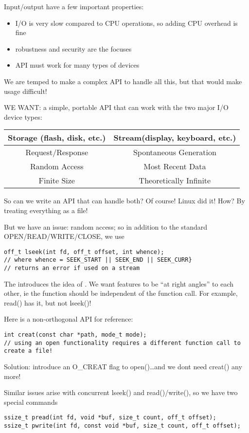 \documentclass[../../lecture_notes.tex]{subfiles}
\begin{document}
Input/output have a few important properties:
\begin{itemize}
\item I/O is very slow compared to CPU operations, so adding CPU overhead is fine
\item robustness and security are the focuses
\item API must work for many types of devices
\end{itemize}

We are temped to make a complex API to handle all this, but that would make usage difficult!

WE WANT: a simple, portable API that can work with the two major I/O device types:
\begin{center}
\begin{tabular}{ c | c }
	Storage (flash, disk, etc.) & Stream(display, keyboard, etc.) \\
	\hline
	Request/Response & Spontaneous Generation \\
	Random Access & Most Recent Data \\
	Finite Size & Theoretically Infinite
\end{tabular}
\end{center}

So can we write an API that can handle both? Of course! Linux did it! How? By treating everything as a file!

But we have an issue: random access; so in addition to the standard OPEN/READ/WRITE/CLOSE, we use 
\begin{lstlisting}
off_t lseek(int fd, off_t offset, int whence);
// where whence = SEEK_START || SEEK_END || SEEK_CURR}
// returns an error if used on a stream
\end{lstlisting}

The introduces the idea of . We want features to be “at right angles” to each other, ie the function should be independent of the function call. For example, read() has it, but not lseek()!


Here is a non-orthogonal API for reference:
\begin{lstlisting}
int creat(const char *path, mode_t mode);
// using an open functionality requires a different function call to create a file!
\end{lstlisting}

Solution: introduce an O\_CREAT flag to open()…and we dont need creat() any more!

Similar issues arise with concurrent lseek() and read()/write(), so we have two special commands
\begin{lstlisting}
ssize_t pread(int fd, void *buf, size_t count, off_t offset);
ssize_t pwrite(int fd, const void *buf, size_t count, off_t offset);
\end{lstlisting}
\end{document}

